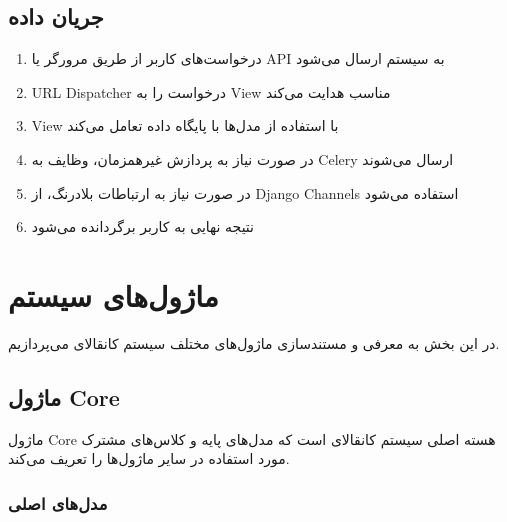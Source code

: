 \documentclass[letterpaper,10pt,english]{sphinxmanual}
\begin{document}
\subsection{جریان داده}
\label{\detokenize{architecture/index:id5}}\begin{enumerate}
%
\item {} 
\sphinxAtStartPar
درخواست‌های کاربر از طریق مرورگر یا API به سیستم ارسال می‌شود

\item {} 
\sphinxAtStartPar
URL Dispatcher درخواست را به View مناسب هدایت می‌کند

\item {} 
\sphinxAtStartPar
View با استفاده از مدل‌ها با پایگاه داده تعامل می‌کند

\item {} 
\sphinxAtStartPar
در صورت نیاز به پردازش غیرهمزمان، وظایف به Celery ارسال می‌شوند

\item {} 
\sphinxAtStartPar
در صورت نیاز به ارتباطات بلادرنگ، از Django Channels استفاده می‌شود

\item {} 
\sphinxAtStartPar
نتیجه نهایی به کاربر برگردانده می‌شود

\end{enumerate}

\sphinxstepscope


\section{ماژول‌های سیستم}
\label{\detokenize{modules/index:modules}}\label{\detokenize{modules/index:id1}}\label{\detokenize{modules/index::doc}}
\sphinxAtStartPar
در این بخش به معرفی و مستندسازی ماژول‌های مختلف سیستم کانقالای می‌پردازیم.

\sphinxstepscope


\subsection{ماژول Core}
\label{\detokenize{modules/core:core}}\label{\detokenize{modules/core:core-module}}\label{\detokenize{modules/core::doc}}
\sphinxAtStartPar
ماژول Core هسته اصلی سیستم کانقالای است که مدل‌های پایه و کلاس‌های مشترک مورد استفاده در سایر ماژول‌ها را تعریف می‌کند.


\subsubsection{مدل‌های اصلی}
\label{\detokenize{modules/core:id1}}
\end{document}
